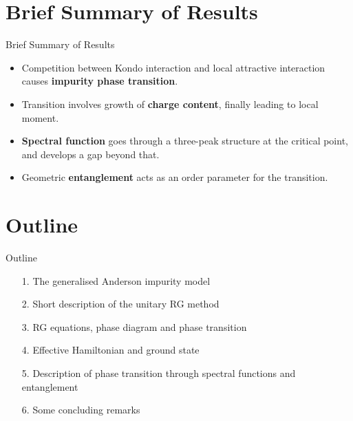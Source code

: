 \documentclass[10pt,aspectratio=169]{beamer}
\newcommand{\focus}[1]{\textcolor{lblue}{\textbf{#1}}}
\begin{document}
\section{Brief Summary of Results}
\begin{frame}[noframenumbering]{Brief Summary of Results}
\begin{itemize}[<+->]
	\item Competition between Kondo interaction and local attractive interaction causes \focus{impurity phase transition}.\\[20pt]
	\item Transition involves growth of \focus{charge content}, finally leading to local moment.\\[20pt]
	\item \focus{Spectral function} goes through a three-peak structure at the critical point, and develops a gap beyond that.\\[20pt]
	\item Geometric \focus{entanglement} acts as an order parameter for the transition.
\end{itemize}
\end{frame}

\section{Outline}
\begin{frame}[noframenumbering]{Outline}
\begin{itemize}[<alert@+>]
	\item[1.] {The generalised Anderson impurity model}\\[10pt]
	\item[2.] {Short description of the unitary RG method}\\[10pt]
	\item[3.] {RG equations, phase diagram and phase transition}\\[10pt]
	\item[4.] {Effective Hamiltonian and ground state}\\[10pt]
	\item[5.] {Description of phase transition through spectral functions and entanglement}\\[10pt]
	\item[6.] {Some concluding remarks}
\end{itemize}
\end{frame}
\end{document}
